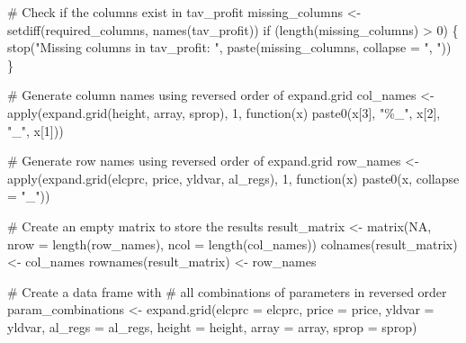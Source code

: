 \documentclass[
  letterpaper,
  DIV=11,
  numbers=noendperiod]{scrartcl}
\newenvironment{Shaded}{\begin{snugshade}}{\end{snugshade}}
\newcommand{\AttributeTok}[1]{\textcolor[rgb]{0.40,0.45,0.13}{#1}}
\newcommand{\CommentTok}[1]{\textcolor[rgb]{0.37,0.37,0.37}{#1}}
\newcommand{\ConstantTok}[1]{\textcolor[rgb]{0.56,0.35,0.01}{#1}}
\newcommand{\ControlFlowTok}[1]{\textcolor[rgb]{0.00,0.23,0.31}{#1}}
\newcommand{\DecValTok}[1]{\textcolor[rgb]{0.68,0.00,0.00}{#1}}
\newcommand{\FunctionTok}[1]{\textcolor[rgb]{0.28,0.35,0.67}{#1}}
\newcommand{\NormalTok}[1]{\textcolor[rgb]{0.00,0.23,0.31}{#1}}
\newcommand{\OtherTok}[1]{\textcolor[rgb]{0.00,0.23,0.31}{#1}}
\newcommand{\SpecialCharTok}[1]{\textcolor[rgb]{0.37,0.37,0.37}{#1}}
\newcommand{\StringTok}[1]{\textcolor[rgb]{0.13,0.47,0.30}{#1}}
\begin{document}
\begin{Shaded}
\begin{Highlighting}[]
\CommentTok{\# Check if the columns exist in tav\_profit}
\NormalTok{missing\_columns }\OtherTok{\textless{}{-}} \FunctionTok{setdiff}\NormalTok{(required\_columns, }
                           \FunctionTok{names}\NormalTok{(tav\_profit))}
\ControlFlowTok{if}\NormalTok{ (}\FunctionTok{length}\NormalTok{(missing\_columns) }\SpecialCharTok{\textgreater{}} \DecValTok{0}\NormalTok{) \{}
  \FunctionTok{stop}\NormalTok{(}\StringTok{"Missing columns in tav\_profit: "}\NormalTok{,}
       \FunctionTok{paste}\NormalTok{(missing\_columns, }\AttributeTok{collapse =} \StringTok{", "}\NormalTok{))}
\NormalTok{\}}

\CommentTok{\# Generate column names using reversed order of expand.grid}
\NormalTok{col\_names }\OtherTok{\textless{}{-}} \FunctionTok{apply}\NormalTok{(}\FunctionTok{expand.grid}\NormalTok{(height, array, sprop), }\DecValTok{1}\NormalTok{,}
                   \ControlFlowTok{function}\NormalTok{(x) }\FunctionTok{paste0}\NormalTok{(x[}\DecValTok{3}\NormalTok{], }\StringTok{"\%\_"}\NormalTok{, x[}\DecValTok{2}\NormalTok{], }\StringTok{"\_"}\NormalTok{, x[}\DecValTok{1}\NormalTok{]))}

\CommentTok{\# Generate row names using reversed order of expand.grid}
\NormalTok{row\_names }\OtherTok{\textless{}{-}} \FunctionTok{apply}\NormalTok{(}\FunctionTok{expand.grid}\NormalTok{(elcprc, }
\NormalTok{                               price,}
\NormalTok{                               yldvar, }
\NormalTok{                               al\_regs), }\DecValTok{1}\NormalTok{, }
                   \ControlFlowTok{function}\NormalTok{(x) }\FunctionTok{paste0}\NormalTok{(x, }\AttributeTok{collapse =} \StringTok{"\_"}\NormalTok{))}

\CommentTok{\# Create an empty matrix to store the results}
\NormalTok{result\_matrix }\OtherTok{\textless{}{-}} \FunctionTok{matrix}\NormalTok{(}\ConstantTok{NA}\NormalTok{, }\AttributeTok{nrow =} \FunctionTok{length}\NormalTok{(row\_names), }
                        \AttributeTok{ncol =} \FunctionTok{length}\NormalTok{(col\_names))}
\FunctionTok{colnames}\NormalTok{(result\_matrix) }\OtherTok{\textless{}{-}}\NormalTok{ col\_names}
\FunctionTok{rownames}\NormalTok{(result\_matrix) }\OtherTok{\textless{}{-}}\NormalTok{ row\_names}

\CommentTok{\# Create a data frame with }
\CommentTok{\# all combinations of parameters in reversed order}
\NormalTok{param\_combinations }\OtherTok{\textless{}{-}} \FunctionTok{expand.grid}\NormalTok{(}\AttributeTok{elcprc =}\NormalTok{ elcprc, }
                                  \AttributeTok{price =}\NormalTok{ price, }
                                  \AttributeTok{yldvar =}\NormalTok{ yldvar, }
                                  \AttributeTok{al\_regs =}\NormalTok{ al\_regs,}
                                  \AttributeTok{height =}\NormalTok{ height, }
                                  \AttributeTok{array =}\NormalTok{ array, }
                                  \AttributeTok{sprop =}\NormalTok{ sprop)}


\end{Highlighting}
\end{Shaded}
\end{document}
